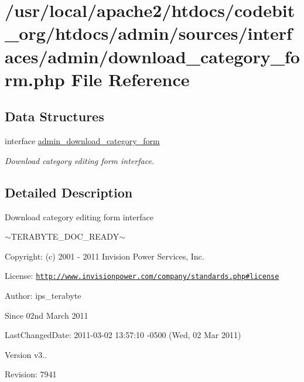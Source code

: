 \hypertarget{download__category__form_8php}{\section{/usr/local/apache2/htdocs/codebit\-\_\-org/htdocs/admin/sources/interfaces/admin/download\-\_\-category\-\_\-form.php File Reference}
\label{download__category__form_8php}
}
\subsection*{Data Structures}
\begin{DoxyCompactItemize}
\item 
interface \hyperlink{interfaceadmin__download__category__form}{admin\-\_\-download\-\_\-category\-\_\-form}
\begin{DoxyCompactList}\small\item\em Download category editing form interface. \end{DoxyCompactList}\end{DoxyCompactItemize}


\subsection{Detailed Description}
\begin{DoxyVerb}  Download category editing form interface
\end{DoxyVerb}
 $\sim$\-T\-E\-R\-A\-B\-Y\-T\-E\-\_\-\-D\-O\-C\-\_\-\-R\-E\-A\-D\-Y$\sim$ \begin{DoxyParagraph}{Copyright\-:}
(c) 2001 -\/ 2011 Invision Power Services, Inc.
\end{DoxyParagraph}
\begin{DoxyParagraph}{License\-:}
\href{http://www.invisionpower.com/company/standards.php#license}{\tt http\-://www.\-invisionpower.\-com/company/standards.\-php\#license}
\end{DoxyParagraph}
\begin{DoxyParagraph}{Author\-:}
ips\-\_\-terabyte 
\end{DoxyParagraph}
\begin{DoxySince}{Since}
02nd March 2011 
\end{DoxySince}
\begin{DoxyParagraph}{Last\-Changed\-Date\-:}
2011-\/03-\/02 13\-:57\-:10 -\/0500 (Wed, 02 Mar 2011) 
\end{DoxyParagraph}
\begin{DoxyVersion}{Version}
v3.. 
\end{DoxyVersion}
\begin{DoxyParagraph}{Revision\-:}
7941 
\end{DoxyParagraph}
